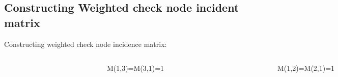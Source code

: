 \documentclass[xcolor=dvipsname]
{beamer}
\begin{document}
\subsection{ Constructing Weighted check node incident matrix }
\begin{frame}[t]
\alert{Constructing weighted check node incidence matrix:}

\begin{columns}
\begin{figure}
\includegraphics[height=2.5cm,width=3cm]{paritymatwtb1}
			\end{figure}

\begin{figure}
\includegraphics[height=2.5cm,width=3.5cm]{tanneri1}
			\end{figure}
			
			M(1,3)=M(3,1)=1
\pause			
{}
\begin{figure}
\includegraphics[height=2.5cm,width=3cm]{paritymatwtb2}
			\end{figure}

\begin{figure}
\includegraphics[height=2.5cm,width=3.5cm]{tanneri2}
			\end{figure}
M(1,2)=M(2,1)=1
			
\pause			
{}
\begin{figure}
		

\end{figure}
\end{columns}
\end{frame}
\end{document}

